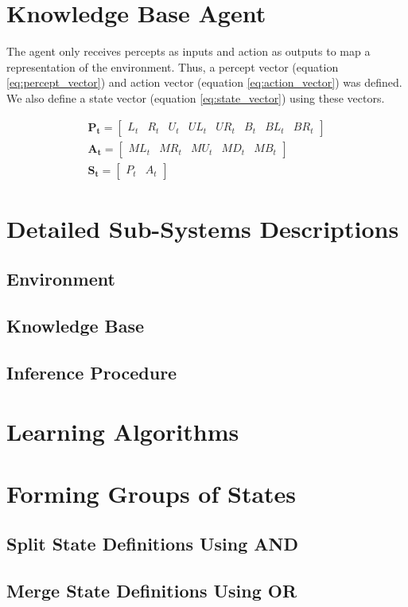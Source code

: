 \section{Knowledge Base Agent}

The agent only receives percepts as inputs and action as outputs to map a representation of the environment. Thus, a percept vector (equation \ref{eq:percept_vector}) and action vector (equation \ref{eq:action_vector}) was defined. We also define a state vector (equation \ref{eq:state_vector}) using these vectors.


\begin{subequations}
\begin{align}
    \mathbf{P_t}=
\begin{bmatrix}
L_t & R_t & U_t & UL_t & UR_t & B_t & BL_t & BR_t
\end{bmatrix} 
 \label{eq:percept_vector}\\
\mathbf{A_t}=
\begin{bmatrix}
ML_t & MR_t & MU_t & MD_t & MB_t 
\end{bmatrix} 
 \label{eq:action_vector}\\
       \mathbf{S_t}=
\begin{bmatrix}
P_t & A_t  
\end{bmatrix}
 \label{eq:state_vector}
\end{align}
\end{subequations}


\section{Detailed Sub-Systems Descriptions}
\subsection{Environment}
\subsection{Knowledge Base}
\subsection{Inference Procedure}
\section{Learning Algorithms} 
\section{Forming Groups of States}
\subsection{Split State Definitions Using AND}
\subsection{Merge State Definitions Using OR}
\newpage
